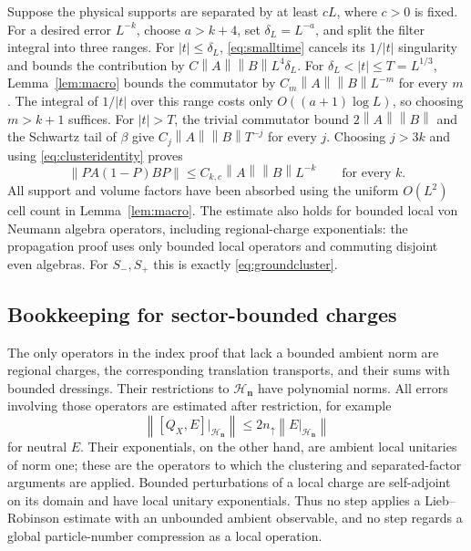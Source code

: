 \documentclass[11pt]{article}
\theoremstyle{definition}
\theoremstyle{remark}
\newcommand{\HH}{\mathcal H}
\newcommand{\up}{\uparrow}
\newcommand{\norm}[1]{\left\lVert#1\right\rVert}
\begin{document}
Suppose the physical supports are separated by at least \(cL\),
where \(c>0\) is fixed.  For a desired error \(L^{-k}\), choose
\(a>k+4\), set \(\delta_L=L^{-a}\), and split the filter integral
into three ranges.  For \(|t|\le\delta_L\),
\eqref{eq:smalltime} cancels its \(1/|t|\) singularity and bounds
the contribution by
\(C\norm A\norm B L^4\delta_L\).
For \(\delta_L<|t|\le T=L^{1/3}\), Lemma~\ref{lem:macro}
bounds the commutator by
\(C_m\norm A\norm B L^{-m}\) for every \(m\).
The integral of \(1/|t|\) over this range costs only
\(O((a+1)\log L)\), so choosing \(m>k+1\) suffices.
For \(|t|>T\), the trivial commutator bound
\(2\norm A\norm B\) and the Schwartz tail of \(\beta\)
give \(C_j\norm A\norm B T^{-j}\) for every \(j\).
Choosing \(j>3k\) and using \eqref{eq:clusteridentity} proves
\begin{equation}\label{eq:clusterbound}
 \norm{PA(1-P)BP}\le C_{k,c}\norm A\norm B L^{-k}
 \qquad\text{for every }k.
\end{equation}
All support and volume factors have been absorbed using the uniform
\(O(L^2)\) cell count in Lemma~\ref{lem:macro}.  The estimate
also holds for bounded local von Neumann algebra operators, including
regional-charge exponentials: the propagation proof uses only bounded
local operators and commuting disjoint even algebras.  For \(S_-,S_+\)
this is exactly \eqref{eq:groundcluster}.

\subsection{Bookkeeping for sector-bounded charges}

The only operators in the index proof that lack a bounded
ambient norm are regional charges, the corresponding
translation transports, and their sums with bounded dressings.
Their restrictions to \(\HH_{\bm n}\) have polynomial norms.
All errors involving those operators are estimated after
restriction, for example
\[
 \norm{[Q_X,E]|_{\HH_{\bm n}}}
 \le2n_\up\norm{E|_{\HH_{\bm n}}}
\]
for neutral \(E\).
Their exponentials, on the other hand, are ambient local
unitaries of norm one; these are the operators to which the
clustering and separated-factor arguments are applied.
Bounded perturbations of a local charge are self-adjoint on
its domain and have local unitary exponentials.
Thus no step applies a Lieb--Robinson estimate with an
unbounded ambient observable, and no step regards a global
particle-number compression as a local operation.
\end{document}
